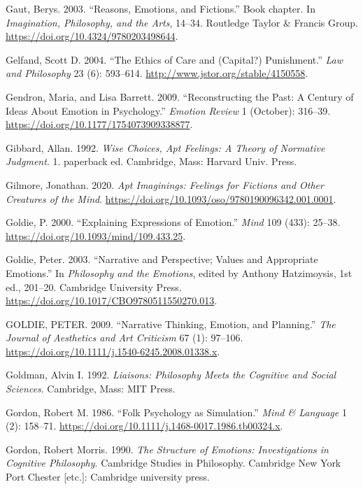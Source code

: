 \documentclass[12pt]{book}
\newenvironment{CSLReferences}%
  {\setlength{\parindent}{0pt}%
   \setlength{\leftskip}{0pt}%
   \setlength{\parskip}{0pt}}%
  {\par}
\theoremstyle{definition}
\theoremstyle{remark}
\begin{document}
\begin{CSLReferences}{1}{0}
Gaut, Berys. 2003. {``Reasons, Emotions, and Fictions.''} Book chapter. In \emph{Imagination, {Philosophy}, and the {Arts}}, 14--34. Routledge Taylor \& Francis Group. \url{https://doi.org/10.4324/9780203498644}.

Gelfand, Scott D. 2004. {``The {Ethics} of {Care} and ({Capital}?) {Punishment}.''} \emph{Law and Philosophy} 23 (6): 593--614. \url{http://www.jstor.org/stable/4150558}.

Gendron, Maria, and Lisa Barrett. 2009. {``Reconstructing the {Past}: {A Century} of {Ideas About Emotion} in {Psychology}.''} \emph{Emotion Review} 1 (October): 316--39. \url{https://doi.org/10.1177/1754073909338877}.

Gibbard, Allan. 1992. \emph{Wise Choices, Apt Feelings: A Theory of Normative Judgment}. 1. paperback ed. Cambridge, Mass: Harvard Univ. Press.

Gilmore, Jonathan. 2020. \emph{Apt {Imaginings}: {Feelings} for {Fictions} and {Other Creatures} of the {Mind}}. \url{https://doi.org/10.1093/oso/9780190096342.001.0001}.

Goldie, P. 2000. {``Explaining Expressions of Emotion.''} \emph{Mind} 109 (433): 25--38. \url{https://doi.org/10.1093/mind/109.433.25}.

Goldie, Peter. 2003. {``Narrative and {Perspective}; {Values} and {Appropriate Emotions}.''} In \emph{Philosophy and the {Emotions}}, edited by Anthony Hatzimoysis, 1st ed., 201--20. Cambridge University Press. \url{https://doi.org/10.1017/CBO9780511550270.013}.

GOLDIE, PETER. 2009. {``Narrative {Thinking}, {Emotion}, and {Planning}.''} \emph{The Journal of Aesthetics and Art Criticism} 67 (1): 97--106. \url{https://doi.org/10.1111/j.1540-6245.2008.01338.x}.

Goldman, Alvin I. 1992. \emph{Liaisons: Philosophy Meets the Cognitive and Social Sciences}. Cambridge, Mass: MIT Press.

Gordon, Robert M. 1986. {``Folk Psychology as Simulation.''} \emph{Mind \& Language} 1 (2): 158--71. \url{https://doi.org/10.1111/j.1468-0017.1986.tb00324.x}.

Gordon, Robert Morris. 1990. \emph{The Structure of Emotions: Investigations in Cognitive Philosophy}. Cambridge Studies in Philosophy. Cambridge New York Port Chester {[}etc.{]}: Cambridge university press.


\end{CSLReferences}
\end{document}
